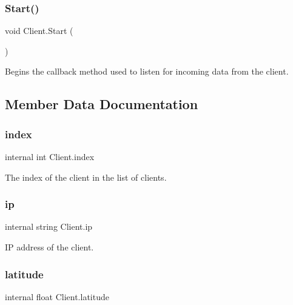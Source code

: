\subsubsection{\texorpdfstring{Start()}{Start()}}
{\footnotesize\ttfamily void Client.\+Start (\begin{DoxyParamCaption}{ }\end{DoxyParamCaption})}



Begins the callback method used to listen for incoming data from the client. 



\subsection{Member Data Documentation}
\mbox{\label{class_client_a6ab52bf1fa672997e9243de8387e7571}} 
\subsubsection{\texorpdfstring{index}{index}}
{\footnotesize\ttfamily internal int Client.\+index\hspace{0.3cm}{\ttfamily [private]}}



The index of the client in the list of clients. 

\mbox{\label{class_client_a0dd1d2611594605d76dc9c6b99182edd}} 
\subsubsection{\texorpdfstring{ip}{ip}}
{\footnotesize\ttfamily internal string Client.\+ip\hspace{0.3cm}{\ttfamily [private]}}



IP address of the client. 

\mbox{\label{class_client_a4b6690d643731c2f872ef4803339aec3}} 
\subsubsection{\texorpdfstring{latitude}{latitude}}
{\footnotesize\ttfamily internal float Client.\+latitude\hspace{0.3cm}{\ttfamily [private]}}



